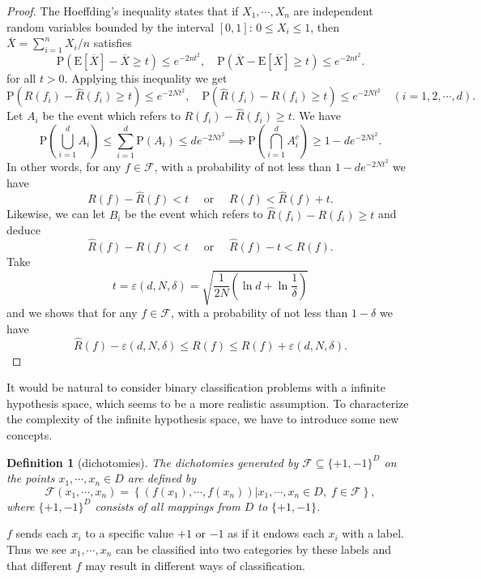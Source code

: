 \documentclass{report}
\newtheorem{definition}{Definition}[chapter]
\theoremstyle{nonumberplain}
\newtheorem{proof}{Proof.}
\newcommand{\0}{\mathbf{0}}
\begin{document}
\begin{proof} The Hoeffding's inequality states that if $X_1,\cdots, X_n$ are independent random variables bounded by the interval $[0, 1]$: $0 \le X_i \le 1$, then $\overline{X}=\sum_{i=1}^{n}X_i/n$ satisfies
\[
\mathrm{P}(\mathrm{E}[\overline{X}]-\overline{X} \geq t) \leq  e^{-2 n t^{2}},\quad\mathrm{P}(\overline{X}-\mathrm{E}[\overline{X}] \geq t) \leq  e^{-2 n t^{2}}.
\]
for all $t>0$. Applying this inequality we get
\[
\mathrm{P}\left(R(f_i)-\widehat{R}(f_i) \ge t\right) \leq  e^{-2 N t^{2}},\quad\mathrm{P}\left(\widehat{R}(f_i)-R(f_i) \ge t\right) \leq  e^{-2 N t^{2}}\quad(i=1,2,\cdots,d).
\]
Let $A_i$ be the event which refers to $R(f_i)-\widehat{R}(f_i) \ge t$. We have
\[
\mathrm{P}\left(\bigcup_{i=1}^d A_i\right)\le \sum_{i=1}^d\mathrm{P}\left( A_i\right)\le de^{-2 N t^{2}}
\implies \mathrm{P}\left(\bigcap_{i=1}^d A_i^c\right)\ge 1- de^{-2 N t^{2}}.
\]
In other words, for any $f\in \mathcal{F}$, with a probability of not less than $1- de^{-2 N t^{2}}$ we have
\[
R(f) - \widehat{R}(f)<t \quad\text{ or }\quad R(f) < \widehat{R}(f)+t.
\]
Likewise, we can let $B_i$ be the event which refers to $\widehat{R}(f_i)-R(f_i) \ge t$ and deduce
\[
\widehat{R}(f) -R(f) <t \quad\text{ or }\quad  \widehat{R}(f)-t<R(f) .
\]
Take
\[
t=\varepsilon(d, N, \delta)=\sqrt{\frac{1}{2 N}\left(\ln d+\ln \frac{1}{\delta}\right)}
\]
and we shows that for any $f\in \mathcal{F}$, with a probability of not less than $1-\delta$ we have
\[
\widehat{R}(f)-\varepsilon(d, N, \delta)\le R(f) \le \widehat{R}(f)+\varepsilon(d, N, \delta).
\]
\end{proof}

It would be natural to consider binary classification problems with a infinite hypothesis space, which seems to be a more realistic assumption. To characterize the complexity of the infinite hypothesis space, we have to introduce some new concepts.

\begin{definition}[dichotomies]
	The \emph{dichotomies} generated by $\mathcal{F}\subseteq\{+1,-1\}^D$ on the points $x_{1}, \cdots, x_{n}\in D$ are defined by
	\[
	\mathcal{F}\left({x}_{1}, \cdots, {x}_{n}\right)=\left\{\left(f\left({x}_{1}\right), \cdots, f\left({x}_{n}\right)\right) |x_{1}, \cdots, x_{n}\in D,\; f \in \mathcal{F}\right\},
	\]
	where $\{+1,-1\}^D$ consists of all mappings from $D$ to $\{+1,-1\}$.
\end{definition}

$f$ sends each $x_i$ to a specific value $+1$ or $-1$ as if it endows each $x_i$ with a label. Thus we see $x_{1}, \cdots, x_{n}$ can be classified into two categories by these labels and that different $f$ may result in different ways of classification.
\end{document}
